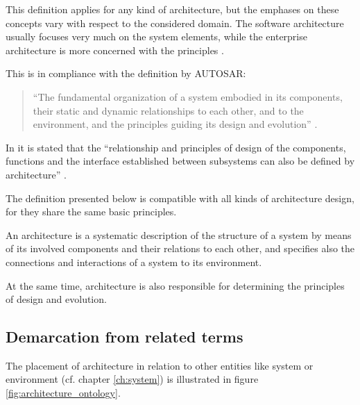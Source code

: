 This definition applies for any kind of architecture, but the emphases on these concepts vary with respect to the considered domain. The software architecture usually focuses very much on the system elements, while the enterprise architecture is more concerned with the principles \cite{ISO_42010}.

This is in compliance with the definition by AUTOSAR:
\begin{quote}
``The fundamental organization of a system embodied in its components, their static and dynamic relationships to each other, and to the environment, and the principles guiding its design and evolution'' \cite{autosar_glossary}.
\end{quote}

In \cite{rodrigues2011} it is stated that the ``relationship and principles of design of the components, functions and the interface established between subsystems can also be defined by architecture'' \cite{rodrigues2011}.

The definition presented below is compatible with all kinds of architecture design, for they share the same basic principles.

\begin{myquote}
An architecture is a systematic description of the structure of a system by means of its involved components and their relations to each other, and specifies also the connections and interactions of a system to its environment.

At the same time, architecture is also responsible for determining the principles of design and evolution.
\end{myquote}


\subsection{Demarcation from related terms}
The placement of architecture in relation to other entities like system or environment (cf. chapter \ref{ch:system}) is illustrated in figure \ref{fig:architecture_ontology}. 

